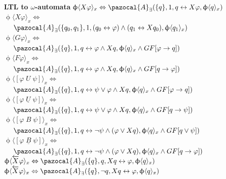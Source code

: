 \documentclass{article}
\newcommand{\Ab}{\pazocal{A}}
\begin{document}
\begin{multicols}{4}
\textbf{LTL to $\omega$-automata}
$\upphi \langle X \varphi\rangle_x \Leftrightarrow \Ab_\exists (\{q\},1,q \leftrightarrow X \varphi, \upphi \langle q \rangle_x)$\\
$\upphi \langle X \varphi\rangle_x \Leftrightarrow $ \\
$\ \ \ \ \Ab_\exists (\{q_0,q_1\},1,(q_0 \leftrightarrow \varphi) \wedge (q_1 \leftrightarrow X q_0), \upphi \langle q_1 \rangle_x)$ \\
$\upphi \langle G \varphi\rangle_x \Leftrightarrow $ \\
$\ \ \ \ \Ab_\exists (\{q\},1,q \leftrightarrow \varphi \wedge X q,\upphi \langle q \rangle_x \wedge GF[\varphi \rightarrow q])$ \\
$\upphi \langle F \varphi\rangle_x \Leftrightarrow$ \\
$\ \ \ \ \Ab_\exists (\{q\},1,q \leftrightarrow \varphi \wedge X q, \upphi \langle q \rangle_x \wedge GF[q \rightarrow \varphi])$ \\
$\upphi \langle [\varphi\; U \; \psi] \rangle_x \Leftrightarrow$ \\
$\ \ \ \ \Ab_\exists (\{q\},1,q \leftrightarrow \psi \vee \varphi \wedge X q, \upphi \langle q \rangle_x \wedge GF[\varphi \rightarrow q])$ \\
$\upphi \langle [\varphi\; \underline{U} \; \psi] \rangle_x \Leftrightarrow$ \\
$\ \ \ \ \Ab_\exists (\{q\},1,q \leftrightarrow \psi \vee \varphi \wedge X q, \upphi \langle q \rangle_x \wedge GF[q \rightarrow \psi])$ \\
$\upphi \langle [\varphi\; B \; \psi] \rangle_x \Leftrightarrow$ \\
$\ \ \ \ \Ab_\exists (\{q\},1,q \leftrightarrow \neg\psi \wedge (\varphi \vee X q), \upphi \langle q \rangle_x \wedge GF[q \vee \psi])$ \\
$\upphi \langle [\varphi\; \underline{B} \; \psi] \rangle_x \Leftrightarrow$ \\
$\ \ \ \ \Ab_\exists (\{q\},1,q \leftrightarrow \neg\psi \wedge (\varphi \vee X q), \upphi \langle q \rangle_x \wedge GF[q \rightarrow \varphi])$ \\
$\upphi \langle \overleftarrow{X} \varphi\rangle_x \Leftrightarrow \Ab_\exists (\{q\},q, Xq \leftrightarrow \varphi, \upphi \langle q \rangle_x)$\\
$\upphi \langle \overleftarrow{X} \varphi\rangle_x \Leftrightarrow \Ab_\exists (\{q\},\neg q, Xq \leftrightarrow \varphi, \upphi \langle q \rangle_x)$\\

\end{multicols}
\end{document}
